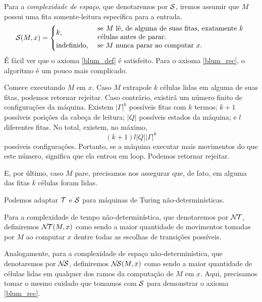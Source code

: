 \begin{example}
    Para a \emph{complexidade de espaço},
    que denotaremos por ${\mathcal{S}}$,
    iremos assumir que $M$ possui uma fita somente-leitura
    específica para a entrada.
    \begin{equation*}
        \PhiDS(M, x) = \begin{cases}
            k, & \text{
                \parbox{0.6\textwidth}{%
                    se $M$ lê, de alguma de suas fitas,
                    exatamente $k$ células
                    antes de parar.
                }
            } \\
            \text{indefinido}, & \text{
                \parbox{0.6\textwidth}{
                    se $M$ nunca parar ao computar $x$.
                }
            }
        \end{cases}
    \end{equation*}
    É fácil ver que o axioma \ref{blum_def} é satisfeito.
    Para o axioma \ref{blum_rec},
    o algoritmo é um pouco mais complicado.

    Comece executando $M$ em $x$.
    Caso $M$ extrapole $k$ células lidas
    em alguma de suas fitas,
    podemos retornar rejeitar.
    Caso contrário,
    existirá um número finito de configurações da máquina.
    Existem $|\Gamma|^k$ possíveis fitas com $k$ termos;
    $k+1$ possíveis posições da cabeça de leitura;
    $|Q|$ possíveis estados da máquina;
    e $l$ diferentes fitas.
    No total, existem, no máximo,
    \begin{equation*}
        (k+1) l |Q||\Gamma|^k
    \end{equation*}
    possíveis configurações.
    Portanto, se a máquina executar
    mais movimentos do que este número,
    significa que ela entrou em loop.
    Podemos retornar rejeitar.

    E, por último,
    caso $M$ pare,
    precisamos nos assegurar que,
    de fato,
    em alguma das fitas $k$ células foram lidas.
\end{example}

\begin{example}
    Podemos adaptar ${\mathcal{T}}$ e ${\mathcal{S}}$
    para máquinas de Turing não-determinísticas.

    Para a complexidade de tempo não-determinística,
    que denotaremos por ${\mathcal{N\!T}}$,
    definiremos ${\mathcal{N\!T}}(M, x)$
    como sendo a maior quantidade de movimentos
    tomadas por $M$ ao computar $x$
    dentre todas as escolhas de transições possíveis.

    Analogamente,
    para a complexidade de espaço não-determinística,
    que denotaremos por ${\mathcal{N\!S}}$,
    definiremos ${\mathcal{N\!S}}(M, x)$
    como sendo a maior quantidade de células lidas
    em qualquer dos ramos da computação de $M$ em $x$.
    Aqui, precisamos tomar o mesmo cuidado que tomamos
    com ${\mathcal{S}}$ para demonstrar o axioma \ref{blum_rec}.
\end{example}

